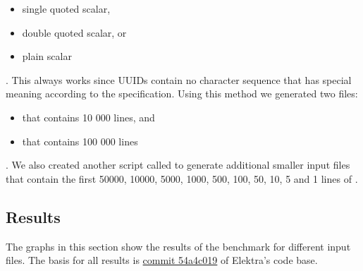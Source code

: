 \begin{itemize}
  \item single quoted scalar,
  \item double quoted scalar, or
  \item plain scalar
\end{itemize}

. This always works since \glspl{UUID} contain no character sequence that has special meaning according to the  specification. Using this method we generated two files:

\begin{itemize}
  \item \FileGenerated{} that contains 10 000 lines, and

  \item \FileGeneratedHundredThousand{} that contains 100 000 lines
\end{itemize}

. We also created another script called \FileCutInput{} to generate additional smaller input files that contain the first 50000, 10000, 5000, 1000, 500, 100, 50, 10, 5 and 1 lines of \FileGeneratedHundredThousand{}.

\subsection{Results}

The graphs in this section show the results of the benchmark for different input files. The basis for all results is \href{https://github.com/ElektraInitiative/libelektra/commit/54a4c0194946917b7d093e0777f465619b2f3d6f}{commit 54a4c019} of Elektra’s code base.

